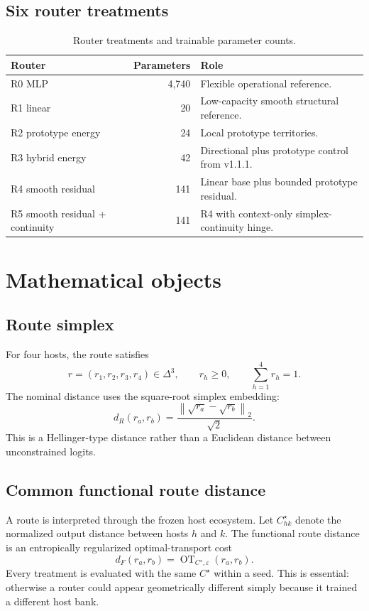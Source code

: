 \documentclass[11pt,a4paper]{article}
\newcommand{\norm}[1]{\left\lVert #1 \right\rVert}
\newcommand{\OT}{\operatorname{OT}}
\begin{document}
\subsection{Six router treatments}
\begin{table}[H]
\centering
\caption{Router treatments and trainable parameter counts.}
\small
\begin{tabularx}{\textwidth}{@{}l r Y@{}}
\toprule
Router & Parameters & Role \\
\midrule
R0 MLP & 4,740 & Flexible operational reference. \\
R1 linear & 20 & Low-capacity smooth structural reference. \\
R2 prototype energy & 24 & Local prototype territories. \\
R3 hybrid energy & 42 & Directional plus prototype control from v1.1.1. \\
R4 smooth residual & 141 & Linear base plus bounded prototype residual. \\
R5 smooth residual + continuity & 141 & R4 with context-only simplex-continuity hinge. \\
\bottomrule
\end{tabularx}
\end{table}

\section{Mathematical objects}
\subsection{Route simplex}
For four hosts, the route satisfies
\begin{equation}
 r=(r_1,r_2,r_3,r_4)\in\Delta^3,
 \qquad r_h\ge 0,
 \qquad \sum_{h=1}^{4}r_h=1.
\end{equation}
The nominal distance uses the square-root simplex embedding:
\begin{equation}
 d_R(r_a,r_b)=\frac{\norm{\sqrt{r_a}-\sqrt{r_b}}_2}{\sqrt{2}}.
\end{equation}
This is a Hellinger-type distance rather than a Euclidean distance between unconstrained logits.

\subsection{Common functional route distance}
A route is interpreted through the frozen host ecosystem. Let $C^\star_{hk}$ denote the normalized output distance between hosts $h$ and $k$. The functional route distance is an entropically regularized optimal-transport cost
\begin{equation}
 d_F(r_a,r_b)=\OT_{C^\star,\varepsilon}(r_a,r_b).
\end{equation}
Every treatment is evaluated with the same $C^\star$ within a seed. This is essential: otherwise a router could appear geometrically different simply because it trained a different host bank.
\end{document}
